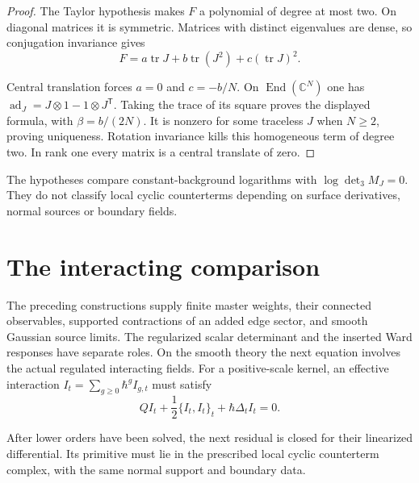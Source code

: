 \begin{proof}
The Taylor hypothesis makes $F$ a polynomial of degree at most
two. On diagonal matrices it is symmetric. Matrices with distinct
eigenvalues are dense, so conjugation invariance gives
\[
 F=a\operatorname{tr}J+b\operatorname{tr}(J^2)
                               +c(\operatorname{tr}J)^2.
\]

Central translation forces $a=0$ and $c=-b/N$.
On $\operatorname{End}(\mathbb C^N)$ one has
$\operatorname{ad}_J=J\otimes1-1\otimes J^{\mathsf T}$.
Taking the trace of its square proves the displayed formula,
with $\beta=b/(2N)$. It is nonzero for some traceless $J$ when
$N\geq2$, proving uniqueness. Rotation invariance kills this
homogeneous term of degree two. In rank one every matrix is
a central translate of zero.
\end{proof}

The hypotheses compare constant-background logarithms with
$\log\det_3M_J=0$. They do not classify local cyclic counterterms
depending on surface derivatives, normal sources or boundary
fields.

\section{The interacting comparison}

The preceding constructions supply finite master weights, their
connected observables, supported contractions of an added edge
sector, and smooth Gaussian source limits. The regularized scalar
determinant and the inserted Ward responses have separate roles.
On the smooth theory the next equation involves the actual
regulated interacting fields. For a positive-scale kernel, an
effective interaction $I_t=\sum_{g\ge0}\hbar^g I_{g,t}$ must satisfy
\[
 QI_t+\frac12\{I_t,I_t\}_t+\hbar\Delta_tI_t=0.
\]

After lower orders have been solved, the next residual is closed
for their linearized differential. Its primitive must lie in the
prescribed local cyclic counterterm complex, with the same normal
support and boundary data.

